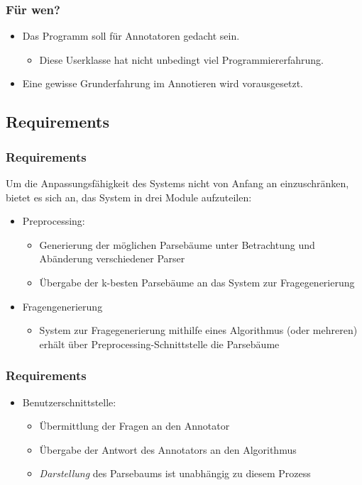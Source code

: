 \documentclass{beamer} %
\begin{document}
\begin{frame}
    \frametitle{Für wen?}
    \begin{itemize}
        \item Das Programm soll für Annotatoren gedacht sein. 
            \begin{itemize}
                \item Diese Userklasse hat nicht unbedingt viel Programmiererfahrung.
            \end{itemize}
        \item Eine gewisse Grunderfahrung im Annotieren wird vorausgesetzt.
    \end{itemize}
\end{frame}

\begin{frame}
    \section{Requirements}
    \frametitle{Requirements}
    Um die Anpassungsfähigkeit des Systems nicht von Anfang an einzuschränken, bietet es sich an, das System in drei Module aufzuteilen:
    \begin{itemize}
        \item Preprocessing: 
            \begin{itemize}
                \item Generierung der möglichen Parsebäume unter Betrachtung und Abänderung verschiedener Parser
                \item Übergabe der k-besten Parsebäume an das System zur Fragegenerierung
            \end{itemize}
        \item Fragengenerierung
            \begin{itemize}
                \item System zur Fragegenerierung mithilfe eines Algorithmus (oder mehreren) erhält über Preprocessing-Schnittstelle die Parsebäume
            \end{itemize}
    \end{itemize}
\end{frame}

\begin{frame}
    \frametitle{Requirements}
    \begin{itemize}
        \item Benutzerschnittstelle: 
            \begin{itemize}
                \item Übermittlung der Fragen an den Annotator
                \item  Übergabe der Antwort des Annotators an den Algorithmus
                \item \textit{Darstellung} des Parsebaums ist unabhängig zu diesem Prozess
            \end{itemize}
    \end{itemize}
\end{frame}
\end{document}
